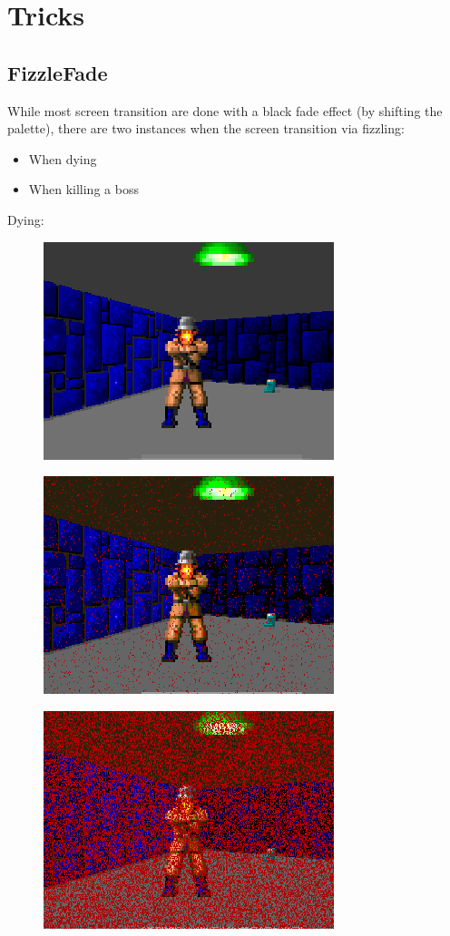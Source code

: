\section{Tricks}

\subsection{FizzleFade}
While most screen transition are done with a black fade effect (by shifting the palette), there are two instances
when the screen transition via fizzling:
\begin{itemize}
	\item When dying
	\item When killing a boss
\end{itemize}


Dying:\\
  \begin{figure}[H] \centering \includegraphics[scale=1.0]{imgs/fizzlefade/dying/screenshot_16.png} \end{figure}
    \begin{figure}[H] \centering \includegraphics[scale=1.0]{imgs/fizzlefade/dying/screenshot_19.png} \end{figure}
      \begin{figure}[H] \centering \includegraphics[scale=1.0]{imgs/fizzlefade/dying/screenshot_52.png} \end{figure}
